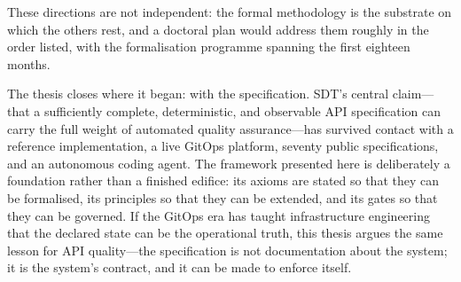 These directions are not independent: the formal methodology is the substrate on which the others rest, and a doctoral plan would address them roughly in the order listed, with the formalisation programme spanning the first eighteen months.

The thesis closes where it began: with the specification. SDT's central claim---that a sufficiently complete, deterministic, and observable API specification can carry the full weight of automated quality assurance---has survived contact with a reference implementation, a live GitOps platform, seventy public specifications, and an autonomous coding agent. The framework presented here is deliberately a foundation rather than a finished edifice: its axioms are stated so that they can be formalised, its principles so that they can be extended, and its gates so that they can be governed. If the GitOps era has taught infrastructure engineering that the declared state can be the operational truth, this thesis argues the same lesson for API quality---the specification is not documentation about the system; it is the system's contract, and it can be made to enforce itself.
